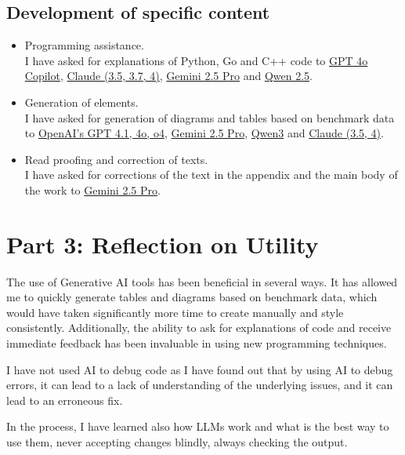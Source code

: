 \subsection*{Development of specific content}
\begin{itemize}
  \item Programming assistance. \\
  I have asked for explanations of Python, Go and C++ code to \href{https://openai.com}{GPT 4o Copilot}, \href{https://www.anthropic.com/api}{Claude (3.5, 3.7, 4)}, \href{https://deepmind.google/models/gemini/pro/}{Gemini 2.5 Pro} and \href{https://qwenlm.github.io/}{Qwen 2.5}.

  \item Generation of elements. \\
  I have asked for generation of diagrams and tables based on benchmark data to \href{https://openai.com}{OpenAI's GPT 4.1, 4o, o4}, \href{https://deepmind.google/models/gemini/pro/}{Gemini 2.5 Pro}, \href{https://qwenlm.github.io/}{Qwen3} and \href{https://www.anthropic.com/api}{Claude (3.5, 4)}.

  \item Read proofing and correction of texts. \\
  I have asked for corrections of the text in the appendix and the main body of the work to \href{https://openai.com}{Gemini 2.5 Pro}.
\end{itemize}

\section*{Part 3: Reflection on Utility}

The use of Generative AI tools has been beneficial in several ways. It has allowed me to quickly generate tables and diagrams based on benchmark data, which would have taken significantly more time to create manually and style consistently. Additionally, the ability to ask for explanations of code and receive immediate feedback has been invaluable in using new programming techniques.

I have not used AI to debug code as I have found out that by using AI to debug errors, it can lead to a lack of understanding of the underlying issues, and it can lead to an erroneous fix. 

In the process, I have learned also how LLMs work and what is the best way to use them, never accepting changes blindly, always checking the output.